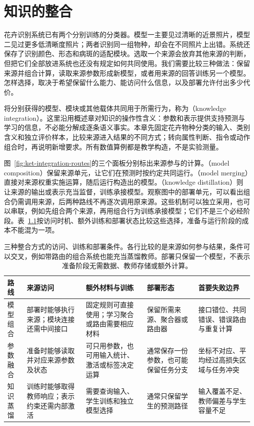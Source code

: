 \chapter{知识的整合}
\label{chap:ket-integration}

花卉识别系统已有两个分别训练的分类器。模型一主要见过清晰的近景照片，模型二见过更多低清晰度照片；两者识别同一组物种，却会在不同照片上出错。系统还保存了识别颜色、形态和病斑的适配模块。选取一个来源会放弃其他来源的判断，但把它们全部放进系统也还没有规定如何共同使用。我们需要比较三种做法：保留来源并组合计算，读取来源参数形成新模型，或者用来源的回答训练另一个模型。怎样选择，取决于希望保留什么能力、能访问什么信息，以及部署允许付出多少代价。

将分别获得的模型、模块或其他载体共同用于所需行为，称为（knowledge integration）。这里沿用概述章对知识的操作性含义：参数和表示提供支持预测与学习的信息，不必能分解成逐条语义事实。本章先固定花卉物种分类的输入、类别含义和独立评价样本，比较来源进入结果的不同方式；转向属性判断、指令或动作组合时，再说明新增要求。所有数值算例都是教学构造，不是实验测量。

图~\ref{fig:ket-integration-routes}的三个面板分别标出来源参与的计算。（model composition）保留来源单元，让它们在预测时按约定共同运行。（model merging）直接对来源权重实施运算，随后运行构造出的模型。（knowledge distillation）则让来源的输出或表示充当监督，训练承接模型。观察图中的部署单元，可以看出组合仍需调用来源，后两种路线不再逐次调用原来源。这些机制可以独立采用，也可以串联，例如先组合两个来源，再用组合行为训练承接模型；它们不是三个必经阶段。表~\ref{tab:ket-integration-route-choice}按访问时机、额外训练和部署状态比较这些选择，准备与运行阶段的成本不能混为一项。

\begin{table}[htbp]
  \centering
  \small
  \begin{tabularx}{\linewidth}{@{}p{22mm}XXXX@{}}
    \toprule
    路线 & 来源访问 & 额外材料与训练 & 部署形态 & 首要失败边界 \\
    \midrule
    模型组合 & 部署时能够执行来源；模块连接还需中间接口 & 固定规则可直接使用；学习聚合或路由需要相应材料 & 保留所需来源、聚合器或路由器 & 接口错位、共同错误、错误路由与重复计算 \\
    参数融合 & 准备时能够读取并对应来源参数及状态 & 可只用参数，也可用输入统计、激活或标签决定运算 & 通常保存一份参数，也可能保留任务分支 & 坐标不对应、平均经过高损失区域与任务冲突 \\
    知识蒸馏 & 训练时能够取得教师响应；表示约束还需内部激活 & 需要查询输入、学生训练和独立模型选择 & 通常只保留学生的预测路径 & 输入覆盖不足、教师偏差与学生容量不足 \\
    \bottomrule
  \end{tabularx}
  \caption{三种整合方式的访问、训练和部署条件。各行比较的是来源如何参与结果，条件可以交叉，例如带路由的组合系统也能充当蒸馏教师。部署只保留一个模型，不表示准备阶段无需数据、教师存储或额外计算。}
  \label{tab:ket-integration-route-choice}
\end{table}

